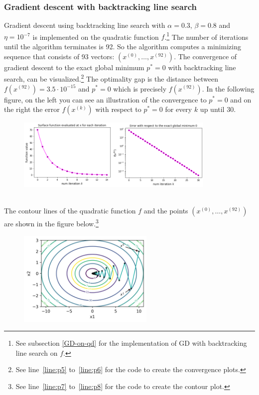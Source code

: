 \subsubsection{Gradient descent with backtracking line search} Gradient descent using backtracking line search with $\alpha = 0.3$, $\beta = 0.8$ and $\eta = 10^{-7}$ is implemented on the quadratic function $f$.\footnote{See subsection \ref{GD-on-qd} for the implementation of GD with backtracking line search on $f.$} The number of iterations until the algorithm terminates is 92. So the algorithm computes a minimizing sequence that consists of 93 vectors: $(x^{(0)},\ldots,x^{(92)})$. The convergence of gradient descent to the exact global minimum $p^{*}=0$ with backtracking line search, can be visualized.\footnote{See line~\ref{line:p5} to~\ref{line:p6} for the code to create the convergence plots.} The optimality gap is the distance between $f(x^{(92)}) = 3.5\cdot 10^{-15}$ and $p^{*}=0$ which is precisely $f(x^{(92)}).$ In the following figure, on the left you can see an illustration of the convergence to $p^{*}=0$ and on the right the error $f(x^{(k)})$ with respect to $p^{*}=0$ for every $k$ up until 30.
\begin{figure}[h!]
    \centering
        \includegraphics[width=0.85\textwidth]{Pictures/Merged_conv_ellipsoid.png}
    \label{fig:convergence1}
\end{figure}\\
The contour lines of the quadratic function $f$ and the points $(x^{(0)},\ldots,x^{(92)})$ are shown in the figure below.\footnote{See line~\ref{line:p7} to~\ref{line:p8} for the code to create the contour plot.}
\begin{figure}[h!]
    \centering
        \includegraphics[width=0.58\textwidth]{Pictures/Level sets of ellipsoid.png}
    \label{fig:levelsets1}
\end{figure}
\newpage
